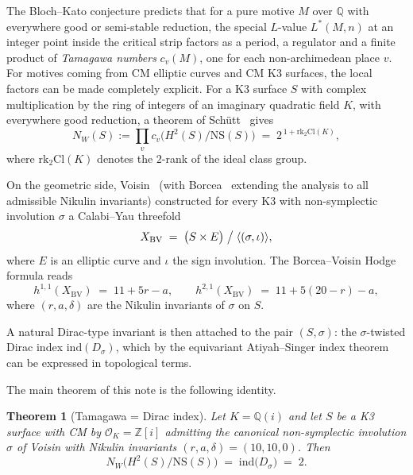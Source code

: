 \documentclass[11pt,a4paper]{article}
\theoremstyle{plain}
\newtheorem{theorem}{Theorem}[section]
\theoremstyle{definition}
\newcommand{\Q}{\mathbb{Q}}
\newcommand{\Z}{\mathbb{Z}}
\newcommand{\OK}{\mathcal{O}_K}
\newcommand{\NS}{\mathrm{NS}}
\newcommand{\rk}{\mathrm{rk}}
\newcommand{\ind}{\mathrm{ind}}
\newcommand{\Cl}{\mathrm{Cl}}
\newcommand{\NW}{N_{W}}
\begin{document}
The Bloch--Kato conjecture predicts that for a pure motive $M$ over $\Q$
with everywhere good or semi-stable reduction, the special $L$-value
$L^{*}(M,n)$ at an integer point inside the critical strip factors as a
period, a regulator and a finite product of \emph{Tamagawa numbers}
$c_{v}(M)$, one for each non-archimedean place $v$. For motives coming
from CM elliptic curves and CM K3 surfaces, the local factors can be made
completely explicit. For a K3 surface $S$ with complex multiplication by
the ring of integers of an imaginary quadratic field $K$, with everywhere
good reduction, a theorem of Sch\"utt~\cite{Schutt2009} gives
\begin{equation}
\label{eq:NW-Schutt}
   \NW(S):=\prod_{v}c_{v}\bigl(H^{2}(S)/\NS(S)\bigr)
   \;=\;
   2^{\,1+\rk_{2}\Cl(K)},
\end{equation}
where $\rk_{2}\Cl(K)$ denotes the $2$-rank of the ideal class group.

On the geometric side, Voisin~\cite{Voisin1993} (with Borcea~\cite{Borcea1997}
extending the analysis to all admissible Nikulin invariants) constructed for
every K3 with non-symplectic involution $\sigma$ a Calabi--Yau threefold
\begin{equation}
\label{eq:BV-threefold}
   X_{\mathrm{BV}}
   \;=\;
   \bigl(S\times E\bigr)\bigm/\langle(\sigma,\iota)\rangle,
\end{equation}
where $E$ is an elliptic curve and $\iota$ the sign involution. The Borcea--Voisin
Hodge formula reads
\begin{equation}
\label{eq:BV-Hodge}
   h^{1,1}(X_{\mathrm{BV}})\;=\;11+5r-a,\qquad
   h^{2,1}(X_{\mathrm{BV}})\;=\;11+5(20-r)-a,
\end{equation}
where $(r,a,\delta)$ are the Nikulin invariants of $\sigma$ on $S$.

A natural Dirac-type invariant is then attached to the pair $(S,\sigma)$:
the $\sigma$-twisted Dirac index $\ind(D_{\sigma})$, which by the
equivariant Atiyah--Singer index theorem~\cite{AtiyahSinger1968III} can be
expressed in topological terms.

The main theorem of this note is the following identity.

\begin{theorem}[Tamagawa = Dirac index]\label{thm:main}
Let $K=\Q(i)$ and let $S$ be a K3 surface with CM by $\OK=\Z[i]$ admitting
the canonical non-symplectic involution $\sigma$ of Voisin
with Nikulin invariants $(r,a,\delta)=(10,10,0)$. Then
\[
   \NW\bigl(H^{2}(S)/\NS(S)\bigr)
   \;=\;
   \ind\bigl(D_{\sigma}\bigr)
   \;=\;
   2.
\]
\end{theorem}
\end{document}
